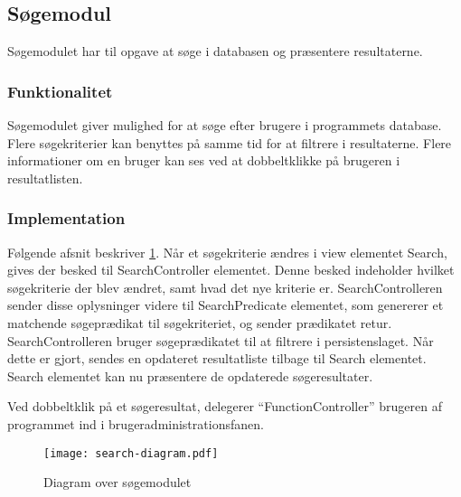 \subsection{Søgemodul}
\label{sub:s_searchmodul}

Søgemodulet har til opgave at søge i databasen og præsentere resultaterne.


\subsubsection{Funktionalitet}

Søgemodulet giver mulighed for at søge efter brugere i programmets database. Flere søgekriterier kan benyttes på samme tid for at filtrere i resultaterne. Flere informationer om en bruger kan ses ved at dobbeltklikke på brugeren i resultatlisten.

\subsubsection{Implementation}

Følgende afsnit beskriver \cref{fig:soegemodul}. Når et søgekriterie ændres i view elementet Search, gives der besked til SearchController elementet. Denne besked indeholder hvilket søgekriterie der blev ændret, samt hvad det nye kriterie er. SearchControlleren sender disse oplysninger videre til SearchPredicate elementet, som genererer et matchende søgeprædikat til søgekriteriet, og sender prædikatet retur. SearchControlleren bruger søgeprædikatet til at filtrere i persistenslaget. Når dette er gjort, sendes en opdateret resultatliste tilbage til Search elementet. Search elementet kan nu præsentere de opdaterede søgeresultater.

Ved dobbeltklik på et søgeresultat, delegerer \enquote{FunctionController} brugeren af programmet ind i brugeradministrationsfanen.

\begin{figure}
  \centering
  \texttt{[image: search-diagram.pdf]}
  \caption{Diagram over søgemodulet} \label{fig:soegemodul}
\end{figure}


